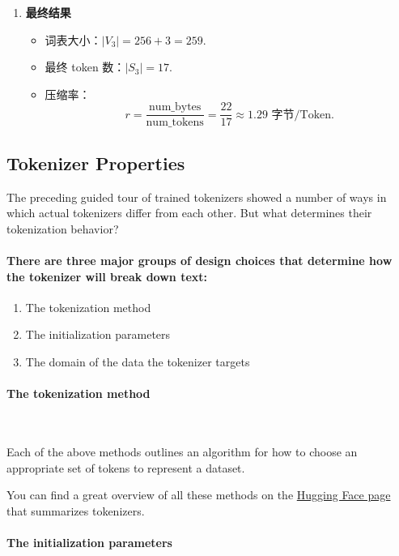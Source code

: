 {\begin{enumerate}[leftmargin=*]
    \item \textbf{最终结果}  
      \begin{itemize}[leftmargin=1.5em,noitemsep]
        \item 词表大小：$|V_3| = 256 + 3 = 259$.  
        \item 最终 token 数：$|S_3| = 17$.  
        \item 压缩率：
          \[
            r = \frac{\text{num\_bytes}}{\text{num\_tokens}}
            = \frac{22}{17}\approx 1.29\text{ 字节/Token}.
          \]
      \end{itemize}
  \end{enumerate}
}

\clearpage
\subsection{Tokenizer Properties}
The preceding guided tour of trained tokenizers showed a number of ways in which actual tokenizers differ from each other. But what determines their tokenization behavior?

\paragraph{There are three major groups of design choices that determine how the tokenizer will break down text:}

\begin{enumerate}
    \item The tokenization method
    \item The initialization parameters
    \item The domain of the data the tokenizer targets
\end{enumerate}

\paragraph{The tokenization method}~{}

Each of the above methods outlines an algorithm for how to choose an appropriate set of tokens to represent a dataset.

You can find a great overview of all these methods on the \href{https://oreil.ly/-vbn0}{Hugging Face page} that summarizes tokenizers.

\paragraph{The initialization parameters}~{}

